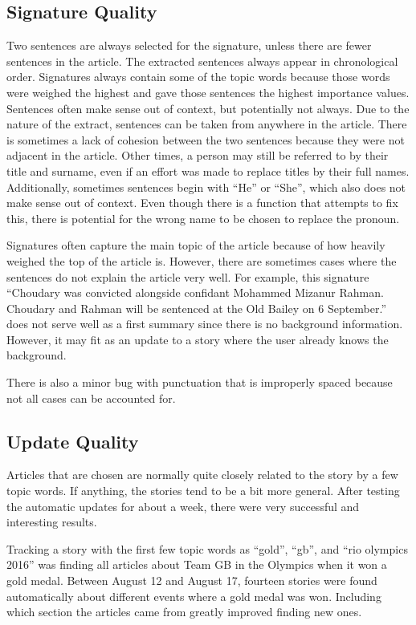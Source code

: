 \documentclass[11pt,titlepage]{report}
\begin{document}
\subsection{Signature Quality}
Two sentences are always selected for the signature, unless there are fewer sentences in the article. The extracted sentences always appear in chronological order. Signatures always contain some of the topic words because those words were weighed the highest and gave those sentences the highest importance values. Sentences often make sense out of context, but potentially not always. Due to the nature of the extract, sentences can be taken from anywhere in the article. There is sometimes a lack of cohesion between the two sentences because they were not adjacent in the article. Other times, a person may still be referred to by their title and surname, even if an effort was made to replace titles by their full names. Additionally, sometimes sentences begin with ``He'' or ``She'', which also does not make sense out of context. Even though there is a function that attempts to fix this, there is potential for the wrong name to be chosen to replace the pronoun.

Signatures often capture the main topic of the article because of how heavily weighed the top of the article is. However, there are sometimes cases where the sentences do not explain the article very well. For example, this signature ``Choudary was convicted alongside confidant Mohammed Mizanur Rahman. Choudary and Rahman will be sentenced at the Old Bailey on 6 September.'' does not serve well as a first summary since there is no background information. However, it may fit as an update to a story where the user already knows the background.

There is also a minor bug with punctuation that is improperly spaced because not all cases can be accounted for. 
\subsection{Update Quality}
Articles that are chosen are normally quite closely related to the story by a few topic words. If anything, the stories tend to be a bit more general. After testing the automatic updates for about a week, there were very successful and interesting results.

Tracking a story with the first few topic words as ``gold'', ``gb'', and ``rio olympics 2016'' was finding all articles about Team GB in the Olympics when it won a gold medal. Between August 12 and August 17, fourteen stories were found automatically about different events where a gold medal was won. Including which section the articles came from greatly improved finding new ones.
\end{document}
